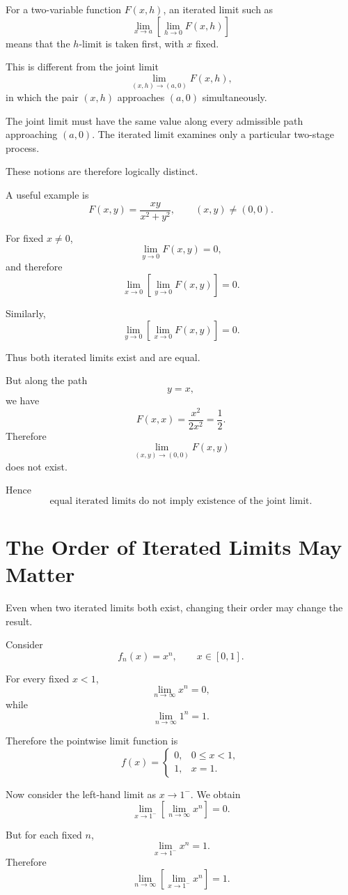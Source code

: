 \documentclass{essay}
\begin{document}
For a two-variable function \(F(x,h)\), an iterated limit such as
\[ \lim_{x\to a} \left[ \lim_{h\to 0}F(x,h) \right] \]
means that the \(h\)-limit is taken first, with \(x\) fixed.

This is different from the joint limit
\[ \lim_{(x,h)\to(a,0)}F(x,h), \]
in which the pair \((x,h)\) approaches \((a,0)\) simultaneously.

The joint limit must have the same value along every admissible path approaching \((a,0)\). The iterated limit examines only a particular two-stage process.

These notions are therefore logically distinct.

A useful example is
\[ F(x,y) = \frac{xy}{x^{2}+y^{2}}, \qquad (x,y)\neq(0,0). \]

For fixed \(x\neq0\),
\[ \lim_{y\to0}F(x,y)=0, \]
and therefore
\[ \lim_{x\to0}\left[\lim_{y\to0}F(x,y)\right]=0. \]

Similarly,
\[ \lim_{y\to0}\left[\lim_{x\to0}F(x,y)\right]=0. \]

Thus both iterated limits exist and are equal.

But along the path
\[ y=x, \]
we have
\[ F(x,x) = \frac{x^{2}}{2x^{2}} = \frac{1}{2}. \]
Therefore
\[ \lim_{(x,y)\to(0,0)}F(x,y) \]
does not exist.

Hence
\[ \boxed{ \text{equal iterated limits do not imply existence of the joint limit.} } \]

\section{The Order of Iterated Limits May Matter}

Even when two iterated limits both exist, changing their order may change the result.

Consider
\[ f_{n}(x)=x^{n}, \qquad x\in[0,1]. \]

For every fixed \(x<1\),
\[ \lim_{n\to\infty}x^{n}=0, \]
while
\[ \lim_{n\to\infty}1^{n}=1. \]

Therefore the pointwise limit function is
\[
  f(x)
  =
  \begin{cases}
    0, & 0\le x<1,\\
    1, & x=1.
  \end{cases}
\]

Now consider the left-hand limit as \(x\to1^{-}\). We obtain
\[ \lim_{x\to1^-} \left[ \lim_{n\to\infty}x^{n} \right] = 0. \]

But for each fixed \(n\),
\[ \lim_{x\to1^-}x^{n}=1. \]
Therefore
\[ \lim_{n\to\infty} \left[ \lim_{x\to1^-}x^{n} \right] = 1. \]
\end{document}

